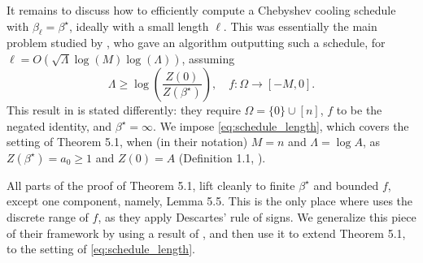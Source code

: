 \documentclass[11pt]{article}
\newcommand{\1}{\mathbf{1}}
\newcommand{\0}{\mathbf{0}}
\newcommand{\Par}[1]{\left(#1\right)}
\newcommand{\Lam}{\Lambda}
\begin{document}
It remains to discuss how to efficiently compute a Chebyshev cooling schedule with $\beta_\ell = \beta^\star$, ideally with a small length $\ell$. This was essentially the main problem studied by \cite{StefankovicVV09}, who gave an algorithm outputting such a schedule, for $\ell = O(\sqrt{\Lam}\log(M)\log(\Lam))$, assuming
\begin{equation}\label{eq:schedule_length} \Lambda \ge \log\Par{\frac{Z(0)}{Z(\beta^\star)}},\quad f: \Omega \to [-M, 0].\end{equation}
This result in \cite{StefankovicVV09} is stated differently: they require $\Omega = \{0\} \cup [n]$, $f$ to be the negated identity, and $\beta^\star = \infty$. We impose \eqref{eq:schedule_length}, which covers the setting of Theorem 5.1, \cite{StefankovicVV09} when (in their notation) $M = n$ and $\Lambda = \log A$, as $Z(\beta^\star) = a_0 \ge 1$ and $Z(0) = A$ (Definition 1.1, \cite{StefankovicVV09}).

All parts of the proof of Theorem 5.1, \cite{StefankovicVV09} lift cleanly to finite $\beta^\star$ and bounded $f$, except one component, namely, Lemma 5.5. This is the only place where \cite{StefankovicVV09} uses the discrete range of $f$, as they apply Descartes' rule of signs. We generalize this piece of their framework by using a result of \cite{Tokarev11}, and then use it to extend Theorem 5.1, \cite{StefankovicVV09} to the setting of \eqref{eq:schedule_length}.
\end{document}
